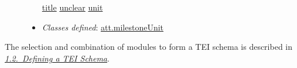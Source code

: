 \begin{description}
\begin{itemize}
\hyperref[TEI.title]{title} \hyperref[TEI.unclear]{unclear} \hyperref[TEI.unit]{unit}
\item {\itshape Classes defined}: \hyperref[TEI.att.milestoneUnit]{att.milestoneUnit}
\end{itemize} 
\end{description}  The selection and combination of modules to form a TEI schema is described in \textit{\hyperref[STIN]{1.2.\ Defining a TEI Schema}}.